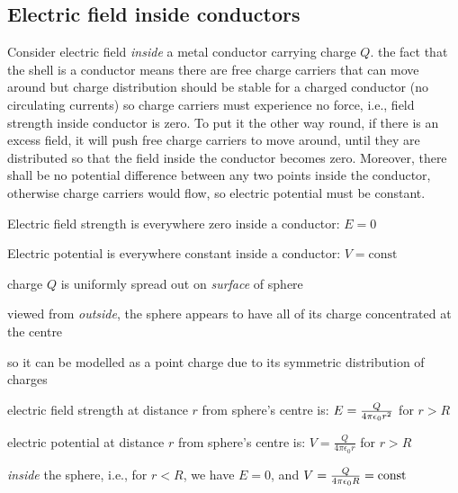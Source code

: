 \subsection{Electric field inside conductors}\label{inside-conductors}

Consider electric field \emph{inside} a metal conductor carrying charge $Q$. the fact that the shell is a conductor means there are free charge carriers that can move around but charge distribution should be stable for a charged conductor (no circulating currents) so charge carriers must experience no force, i.e., field strength inside conductor is zero. To put it the other way round, if there is an excess field, it will push free charge carriers to move around, until they are distributed so that the field inside the conductor becomes zero. Moreover, there shall be no potential difference between any two points inside the conductor, otherwise charge carriers would flow, so electric potential must be constant.

\begin{ilight}
	\centering
	
	Electric field strength is everywhere zero inside a conductor: $E=0$
	
	Electric potential is everywhere constant inside a conductor: $V=\text{const}$
\end{ilight}

\label{ex-metal-sphere}


\begin{soln}
charge $Q$ is uniformly spread out on \emph{surface} of sphere

viewed from \emph{outside}, the sphere appears to have all of its charge concentrated at the centre

so it can be modelled as a point charge due to its symmetric distribution of charges

electric field strength at distance $r$ from sphere's centre is: $E = \frac{Q}{4\pi\epsilon_0 r^2}$ for $r>R$

electric potential at distance $r$ from sphere's centre is: $V=\frac{Q}{4\pi\epsilon_0r}$ for $r>R$

\emph{inside} the sphere, i.e., for $r<R$, we have $E=0$, and $V=\frac{Q}{4\pi\epsilon_0 R} = \text{const}$ \end{soln}

